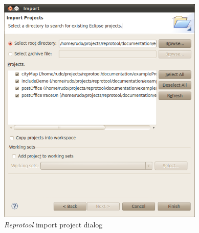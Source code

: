 \begin{figure}[ht]
  \centering
  \includegraphics[width=280pt]{images/reprotoolImport}
  \caption{\emph{Reprotool} import project dialog}
  \label{fig:reprotoolImport}
\end{figure}